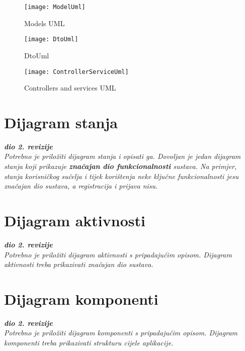 			\begin{figure}[H]
				\texttt{[image: ModelUml]} %
				\centering
				\caption{Models UML}
				\label{fig:modelUml}
			\end{figure}
			\begin{figure}[H]
				\texttt{[image: DtoUml]} %
				\centering
				\caption{DtoUml}
				\label{fig:dtouml}
			\end{figure}
			\begin{figure}[H]
				\texttt{[image: ControllerServiceUml]} %
				\centering
				\caption{Controllers and services UML}
				\label{fig:controllersServicesUml}
		\end{figure}
		\section{Dijagram stanja}
			
			
			\textbf{\textit{dio 2. revizije}}\\
			
			\textit{Potrebno je priložiti dijagram stanja i opisati ga. Dovoljan je jedan dijagram stanja koji prikazuje \textbf{značajan dio funkcionalnosti} sustava. Na primjer, stanja korisničkog sučelja i tijek korištenja neke ključne funkcionalnosti jesu značajan dio sustava, a registracija i prijava nisu. }
			
			
			\eject 
		
		\section{Dijagram aktivnosti}
			
			\textbf{\textit{dio 2. revizije}}\\
			
			 \textit{Potrebno je priložiti dijagram aktivnosti s pripadajućim opisom. Dijagram aktivnosti treba prikazivati značajan dio sustava.}
			
			\eject
		\section{Dijagram komponenti}
		
			\textbf{\textit{dio 2. revizije}}\\
		
			 \textit{Potrebno je priložiti dijagram komponenti s pripadajućim opisom. Dijagram komponenti treba prikazivati strukturu cijele aplikacije.}